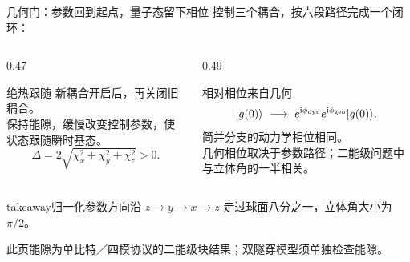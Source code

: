 \documentclass[aspectratio=169,11pt]{beamer}
\newcommand{\source}[1]{{\par\vspace{0.1cm}\fontsize{7.5}{10}\selectfont\color{Muted}#1\par}}
\newcommand{\takeaway}[1]{%
  \begin{beamercolorbox}[wd=\linewidth,sep=0.6em]{takeaway}\small #1\end{beamercolorbox}}
\newcommand{\ket}[1]{\lvert #1\rangle}
\newcommand{\iu}{\mathrm{i}}
\begin{document}
\begin{frame}[t,shrink=2]{几何门：参数回到起点，量子态留下相位}
  \small
  控制三个耦合，按六段路径完成一个闭环：
  \vspace{0.2cm}
  {\centering
  \par}
  \begin{columns}[T,onlytextwidth]
    \begin{column}{0.47\textwidth}
      \begin{block}{绝热跟随}
        新耦合开启后，再关闭旧耦合。\\[0.12cm]
        保持能隙，缓慢改变控制参数，使状态跟随瞬时基态。
        \[
          \Delta=2\sqrt{\chi_x^2+\chi_y^2+\chi_z^2}>0.
        \]
      \end{block}
    \end{column}
    \begin{column}{0.49\textwidth}
      \begin{block}{相对相位来自几何}
        \[
          \ket{g(0)}\ \longrightarrow\
          e^{\iu\phi_{\rm dyn}}e^{\iu\phi_{\rm geo}}\ket{g(0)}.
        \]
        简并分支的动力学相位相同。\\[0.12cm]
        几何相位取决于参数路径；二能级问题中与立体角的一半相关。
      \end{block}
    \end{column}
  \end{columns}
  \vspace{0.15cm}
  \takeaway{归一化参数方向沿 $z\to y\to x\to z$ 走过球面八分之一，立体角大小为 $\pi/2$。}
  \source{此页能隙为单比特／四模协议的二能级块结果；双隧穿模型须单独检查能隙。}
\end{frame}
\end{document}

